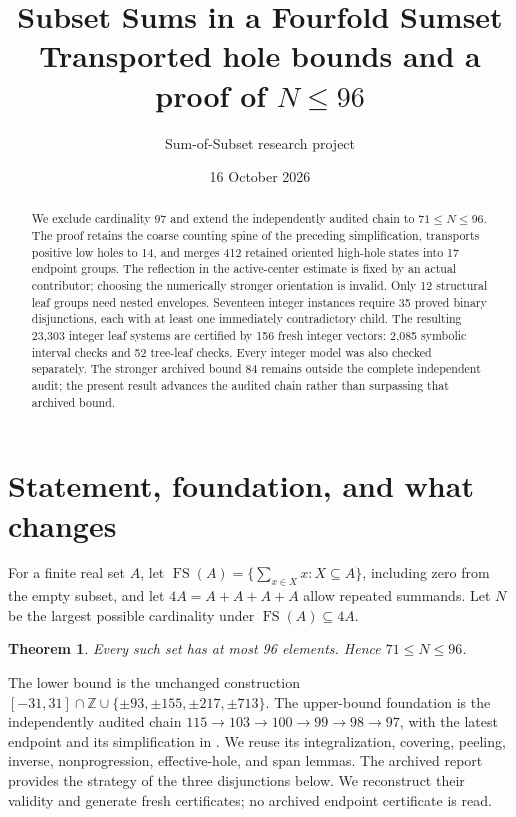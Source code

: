 \documentclass[11pt,a4paper]{article}
\title{Subset Sums in a Fourfold Sumset\\\large Transported hole bounds and a proof of $N\le96$}
\author{Sum-of-Subset research project}
\date{16 October 2026}
\newcommand{\FS}{\operatorname{FS}}
\newtheorem{theorem}{Theorem}[section]
\begin{document}
\maketitle
\begin{abstract}
We exclude cardinality 97 and extend the independently audited chain to
$71\le N\le96$. The proof retains the coarse counting spine of the
preceding simplification, transports positive low holes to 14, and merges
412 retained oriented high-hole states into 17 endpoint groups.
The reflection in the active-center estimate is fixed by an actual
contributor; choosing the numerically stronger orientation is invalid.
Only 12 structural leaf groups need nested envelopes. Seventeen integer
instances require 35 proved binary disjunctions, each with at least one
immediately contradictory child. The resulting 23,303 integer leaf
systems are certified by 156 fresh integer vectors: 2,085 symbolic
interval checks and 52 tree-leaf checks. Every integer model was also
checked separately. The stronger archived bound 84 remains outside the
complete independent audit; the present result advances the audited
chain rather than surpassing that archived bound.
\end{abstract}

\section{Statement, foundation, and what changes}
For a finite real set $A$, let
$\FS(A)=\{\sum_{x\in X}x:X\subseteq A\}$, including zero from the empty
subset, and let $4A=A+A+A+A$ allow repeated summands.
Let $N$ be the largest possible cardinality under $\FS(A)\subseteq4A$.
\begin{theorem}\label{thm:main}
Every such set has at most 96 elements. Hence $71\le N\le96$.
\end{theorem}
The lower bound is the unchanged construction
$[-31,31]\cap\mathbb Z\cup\{\pm93,\pm155,\pm217,\pm713\}$.
The upper-bound foundation is the independently audited chain
$115\to103\to100\to99\to98\to97$, with the latest endpoint and its
simplification in \cite{previous,method}. We reuse its integralization,
covering, peeling, inverse, nonprogression, effective-hole, and span lemmas.
The archived report \cite{archive} provides the strategy of the three
disjunctions below. We reconstruct their validity and generate fresh
certificates; no archived endpoint certificate is read.
\end{document}
